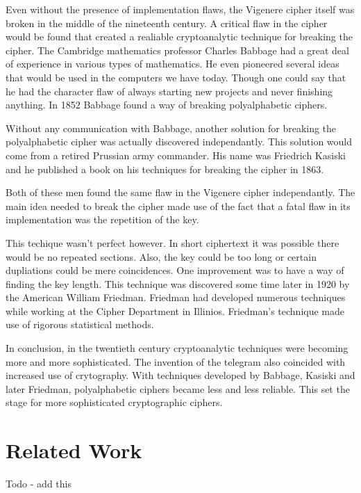 \documentclass{article}
\begin{document}
    Even without the presence of implementation flaws, the Vigenere cipher itself was
    broken in the middle of the nineteenth century. A critical flaw in the cipher
    would be found that created a realiable cryptoanalytic technique for breaking
    the cipher.
    The Cambridge mathematics professor Charles Babbage had a great deal of
    experience in various types of mathematics. He even pioneered several ideas
    that would be used in the computers we have today. Though one could say that
    he had the character flaw of always starting new projects and never finishing anything.
    In 1852 Babbage found a way of breaking polyalphabetic ciphers.

    Without any communication with Babbage, another solution for breaking the polyalphabetic
    cipher was actually discovered independantly. This solution would come
    from a retired Prussian army commander. His name was Friedrich Kasiski and he published
    a book on his techniques for breaking the cipher in 1863.

    Both of these men found the same flaw in the Vigenere cipher independantly.
    The main idea needed to break the cipher made use of the fact that a fatal
    flaw in its implementation was the repetition of the key.

    This techique wasn't perfect however. In short ciphertext it was possible there
    would be no repeated sections. Also, the key could be too long or certain dupliations
    could be mere coincidences.
    One improvement was to have a way of finding the key length. This technique was
    discovered some time later in 1920 by the American William Friedman. Friedman had
    developed numerous techniques while working at the Cipher Department in Illinios.
    Friedman's technique made use of rigorous statistical methods.

    In conclusion, in the twentieth century cryptoanalytic techniques were becoming
    more and more sophisticated. The invention of the telegram also coincided
    with increased use of crytography. With techniques developed by Babbage,
    Kasiski and later Friedman, polyalphabetic ciphers became less and less reliable.
    This set the stage for more sophisticated cryptographic ciphers.
    
    \section{Related Work}

    Todo - add this
\end{document}
